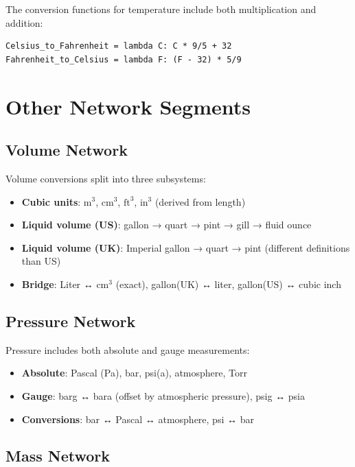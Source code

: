 \documentclass[11pt,a4paper]{report}
\begin{document}
The conversion functions for temperature include both multiplication and addition:
\begin{lstlisting}[style=pythonstyle, caption={Temperature conversion example}]
Celsius_to_Fahrenheit = lambda C: C * 9/5 + 32
Fahrenheit_to_Celsius = lambda F: (F - 32) * 5/9
\end{lstlisting}

\section{Other Network Segments}

\subsection{Volume Network}

Volume conversions split into three subsystems:
\begin{itemize}[leftmargin=*]
  \item \textbf{Cubic units}: $\text{m}^3$, $\text{cm}^3$, $\text{ft}^3$, $\text{in}^3$ (derived from length)
  \item \textbf{Liquid volume (US)}: gallon → quart → pint → gill → fluid ounce
  \item \textbf{Liquid volume (UK)}: Imperial gallon → quart → pint (different definitions than US)
  \item \textbf{Bridge}: Liter ↔ $\text{cm}^3$ (exact), gallon(UK) ↔ liter, gallon(US) ↔ cubic inch
\end{itemize}

\subsection{Pressure Network}

Pressure includes both absolute and gauge measurements:
\begin{itemize}[leftmargin=*]
  \item \textbf{Absolute}: Pascal (Pa), bar, psi(a), atmosphere, Torr
  \item \textbf{Gauge}: barg ↔ bara (offset by atmospheric pressure), psig ↔ psia
  \item \textbf{Conversions}: bar ↔ Pascal ↔ atmosphere, psi ↔ bar
\end{itemize}

\subsection{Mass Network}
\end{document}
